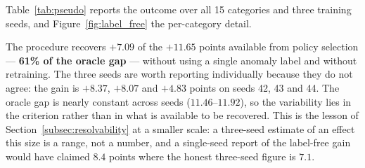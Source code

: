Table~\ref{tab:pseudo} reports the outcome over all 15 categories and three
training seeds, and Figure~\ref{fig:label_free} the per-category detail.

\begin{table}[t]
\centering
\caption{Label-free selection of the scoring policy on 15 MVTec-AD categories,
from 111 candidate policies, repeated on three independently trained students.
Every row is measured on the same trained models within a column; no row above
the oracle requires a real anomaly label. Columns are individual seeds, because
they do not agree (see the text).}
\label{tab:pseudo}

\end{table}

The procedure recovers $\mathbf{+7.09}$ of the $+11.65$ points available from
policy selection --- \textbf{61\% of the oracle gap} --- without using a single
anomaly label and without retraining. The three seeds are worth reporting
individually because they do not agree: the gain is $+8.37$, $+8.07$ and $+4.83$
points on seeds 42, 43 and 44. The oracle gap is nearly constant across seeds
($11.46$--$11.92$), so the variability lies in the criterion rather than in what
is available to be recovered. This is the lesson of Section~\ref{subsec:resolvability}
at a smaller scale: a three-seed estimate of an effect this size is a range, not a
number, and a single-seed report of the label-free gain would have claimed $8.4$
points where the honest three-seed figure is $7.1$.

